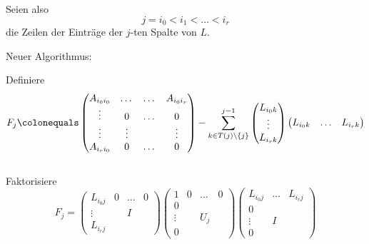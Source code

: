\bigskip

Seien also
\begin{equation*}
 j = i_0 < i_1 < \dots < i_r
\end{equation*}
die Zeilen der Einträge der $j$-ten Spalte von $L$.

Neuer Algorithmus:

\medskip

\begin{algorithm}[H]
 \SetAlgoLined

 {
  Definiere
 \begin{equation*}
  F_j
  \colonequals
  \begin{pmatrix}
   A_{i_0 i_0} & \dots & \dots & A_{i_0 i_r} \\
   \vdots & 0 & \dots & 0 \\
   \vdots & \vdots & & \vdots \\
   A_{i_r i_0} & 0 & \dots & 0
  \end{pmatrix}
  -
  \sum_{k \in T(j) \setminus \{ j \}}^{j-1}
  \begin{pmatrix}
   L_{i_0k} \\
   \vdots \\
   L_{i_r k}
  \end{pmatrix}
  \begin{pmatrix}
   L_{i_0 k} & \ldots & L_{i_r k}
  \end{pmatrix}
  \end{equation*}
 \\
 Faktorisiere
 \begin{equation*}
  F_j
  =
  \begin{pmatrix}
   L_{i_0 j} & 0 & \dots & 0 \\
   \vdots & & I & \\
   L_{i_r j} & & &
  \end{pmatrix}
  \begin{pmatrix}
   1 & 0 & \dots & 0 \\
   0 \\
   \vdots & & U_j \\
   0
  \end{pmatrix}
  \begin{pmatrix}
   L_{i_0 j} & \dots & L_{i_rj} \\
   0 \\
   \vdots & I & \\
   0 & &
  \end{pmatrix}
 \end{equation*}
 }
\end{algorithm}


